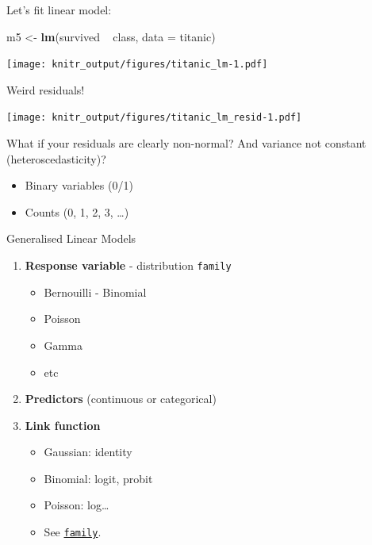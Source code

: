 \documentclass[10pt,ignorenonframetext,]{beamer}
\newenvironment{Shaded}{\begin{snugshade}}{\end{snugshade}}
\newcommand{\KeywordTok}[1]{\textcolor[rgb]{0.13,0.29,0.53}{\textbf{{#1}}}}
\newcommand{\DataTypeTok}[1]{\textcolor[rgb]{0.13,0.29,0.53}{{#1}}}
\newcommand{\StringTok}[1]{\textcolor[rgb]{0.31,0.60,0.02}{{#1}}}
\newcommand{\NormalTok}[1]{{#1}}
\providecommand{\tightlist}{%
\setlength{\itemsep}{0pt}\setlength{\parskip}{0pt}}
\begin{document}
\begin{frame}[fragile]{Let's fit linear model:}

\begin{Shaded}
\begin{Highlighting}[]
\NormalTok{m5 <-}\StringTok{ }\KeywordTok{lm}\NormalTok{(survived ~}\StringTok{ }\NormalTok{class, }\DataTypeTok{data =} \NormalTok{titanic)}
\end{Highlighting}
\end{Shaded}

\texttt{[image: knitr\_output/figures/titanic\_lm-1.pdf]}

\end{frame}

\begin{frame}{Weird residuals!}

\texttt{[image: knitr\_output/figures/titanic\_lm\_resid-1.pdf]}

\end{frame}

\begin{frame}{What if your residuals are clearly non-normal? \textbar{}
And variance not constant (heteroscedasticity)?}

\begin{itemize}[<+->]
\tightlist
\item
  Binary variables (0/1)
\item
  Counts (0, 1, 2, 3, \ldots{})
\end{itemize}

\end{frame}

\begin{frame}[fragile]{Generalised Linear Models}

\begin{enumerate}[<+->]
\def\labelenumi{\arabic{enumi}.}
\item
  \textbf{Response variable} - distribution \texttt{family}

  \begin{itemize}[<+->]
  \tightlist
  \item
    Bernouilli - Binomial
  \item
    Poisson
  \item
    Gamma
  \item
    etc
  \end{itemize}
\item
  \textbf{Predictors} (continuous or categorical)
\item
  \textbf{Link function}

  \begin{itemize}[<+->]
  \tightlist
  \item
    Gaussian: identity
  \item
    Binomial: logit, probit
  \item
    Poisson: log\ldots{}
  \item
    See
    \href{http://www.rdocumentation.org/packages/stats/functions/family}{\texttt{family}}.
  \end{itemize}
\end{enumerate}

\end{frame}
\end{document}
